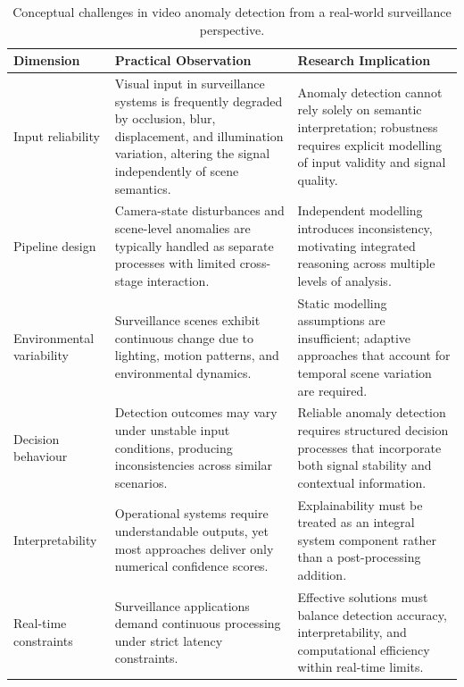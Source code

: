 \documentclass[sensors,article,submit,pdftex,moreauthors]{Definitions/mdpi}
\begin{document}
\begin{table}[h]
\centering
\caption{Conceptual challenges in video anomaly detection from a real-world surveillance perspective.}
\label{tab:challenges}
\scriptsize
\setlength{\tabcolsep}{4pt}
\begin{tabularx}{\linewidth}{p{2.2cm} X X}
\toprule
\textbf{Dimension} & \textbf{Practical Observation} & \textbf{Research Implication} \\
\midrule
 
Input reliability &
Visual input in surveillance systems is frequently degraded by occlusion, blur, displacement, and illumination variation, altering the signal independently of scene semantics. &
Anomaly detection cannot rely solely on semantic interpretation; robustness requires explicit modelling of input validity and signal quality. \\
 
Pipeline design &
Camera-state disturbances and scene-level anomalies are typically handled as separate processes with limited cross-stage interaction. &
Independent modelling introduces inconsistency, motivating integrated reasoning across multiple levels of analysis. \\
 
Environmental variability &
Surveillance scenes exhibit continuous change due to lighting, motion patterns, and environmental dynamics. &
Static modelling assumptions are insufficient; adaptive approaches that account for temporal scene variation are required. \\
 
Decision behaviour &
Detection outcomes may vary under unstable input conditions, producing inconsistencies across similar scenarios. &
Reliable anomaly detection requires structured decision processes that incorporate both signal stability and contextual information. \\
 
Interpretability &
Operational systems require understandable outputs, yet most approaches deliver only numerical confidence scores. &
Explainability must be treated as an integral system component rather than a post-processing addition. \\
 
Real-time constraints &
Surveillance applications demand continuous processing under strict latency constraints. &
Effective solutions must balance detection accuracy, interpretability, and computational efficiency within real-time limits. \\
 
\bottomrule
\end{tabularx}
\end{table}
 
\end{document}

